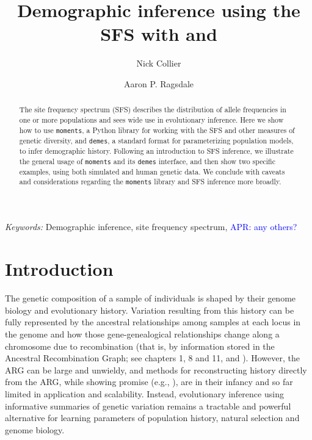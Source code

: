 \documentclass[]{article}
\title{Demographic inference using the SFS with \moments and \demes}
\author[1]{Nick Collier}
\author[1,*]{Aaron P. Ragsdale}
\affil[1]{Department of Integrative Biology, University of Wisconsin--Madison}
\affil[*]{apragsdale@wisc.edu}
\affil[ ]{ORCID IDs: 0009-0005-0385-9798 (NC), 0000-0003-0715-3432 (APR)}
\newcommand{\aprcomment}[1]{{\textcolor{blue}{APR: #1}}}
\newcommand{\moments}{\texttt{moments}\xspace}
\newcommand{\demes}{\texttt{demes}\xspace}
\begin{document}
\linenumbers
\doublespacing

\maketitle

\begin{abstract}

    The site frequency spectrum (SFS) describes the distribution of allele
    frequencies in one or more populations and sees wide use in evolutionary
    inference. Here we show how to use \moments, a Python library for working
    with the SFS and other measures of genetic diversity, and \demes, a
    standard format for parameterizing population models, to infer demographic
    history. Following an introduction to SFS inference, we illustrate the
    general usage of \moments and its \demes interface, and then show two
    specific examples, using both simulated and human genetic data. We conclude
    with caveats and considerations regarding the \moments library and SFS
    inference more broadly.

\end{abstract}

\emph{Keywords:} Demographic inference, site frequency spectrum, \aprcomment{any others?}


\section*{Introduction}

The genetic composition of a sample of individuals is shaped by their genome
biology and evolutionary history. Variation resulting from this history can be
fully represented by the ancestral relationships among samples at each locus in
the genome and how those gene-genealogical relationships change along a
chromosome due to recombination (that is, by information stored in the
Ancestral Recombination Graph; see chapters 1, 8 and 11, and
\cite{nielsen2025inference}). However, the ARG can be large and unwieldy, and
methods for reconstructing history directly from the ARG, while showing promise
(e.g., \cite{yc2022evaluation, fan2023likelihood, brandt2024promise}), are in
their infancy and so far limited in application and scalability. Instead,
evolutionary inference using informative summaries of genetic variation remains
a tractable and powerful alternative for learning parameters of population
history, natural selection and genome biology.
\end{document}
